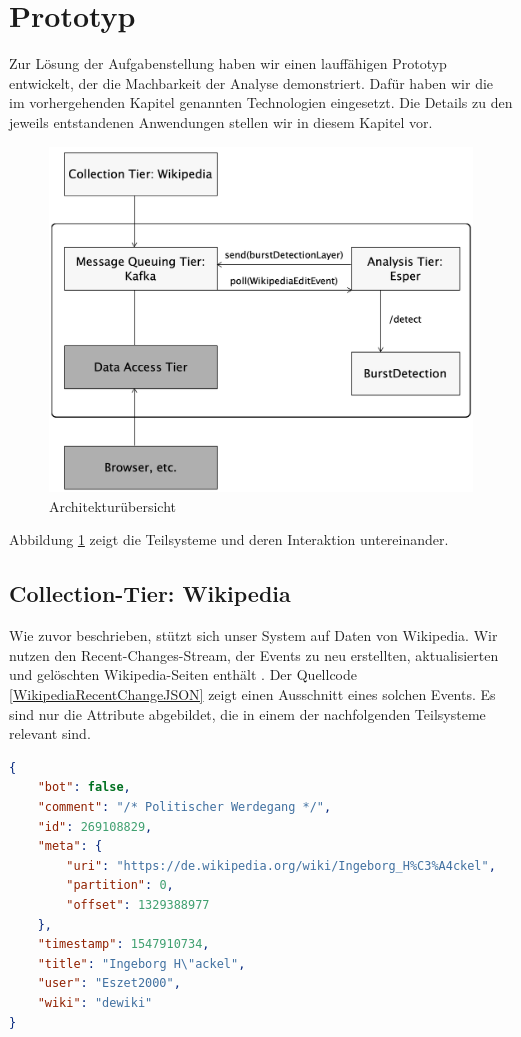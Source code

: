 \section{Prototyp}\label{section:prototyp}
Zur Lösung der Aufgabenstellung haben wir einen lauffähigen Prototyp entwickelt, der die Machbarkeit der Analyse demonstriert.
Dafür haben wir die im vorhergehenden Kapitel genannten Technologien eingesetzt. Die Details zu den jeweils entstandenen
Anwendungen stellen wir in diesem Kapitel vor.

\begin{figure}[h]
    \includegraphics[width=.5\textwidth]{images/Architektur_Uebersicht.png}
    \caption{Architekturübersicht}
    \label{fig:architektur_uebersicht}
\end{figure}

Abbildung \ref{fig:architektur_uebersicht} zeigt die Teilsysteme und deren Interaktion untereinander.


\subsection{Collection-Tier: Wikipedia}
Wie zuvor beschrieben, stützt sich unser System auf Daten von Wikipedia. Wir nutzen den Recent-Changes-Stream, der
Events zu neu erstellten, aktualisierten und gelöschten Wikipedia-Seiten enthält \cite{WikimediaManual}.
Der Quellcode \ref{WikipediaRecentChangeJSON} zeigt einen Ausschnitt eines solchen Events.
Es sind nur die Attribute abgebildet, die in einem der nachfolgenden Teilsysteme relevant sind.

\begin{lstlisting}[label=WikipediaRecentChangeJSON,caption=Wikipedia Recent-Change-Event,language=json,firstnumber=1,captionpos=b]
{
    "bot": false,
    "comment": "/* Politischer Werdegang */",
    "id": 269108829,
    "meta": {
        "uri": "https://de.wikipedia.org/wiki/Ingeborg_H%C3%A4ckel",
        "partition": 0,
        "offset": 1329388977
    },
    "timestamp": 1547910734,
    "title": "Ingeborg H\"ackel",
    "user": "Eszet2000",
    "wiki": "dewiki"
}
\end{lstlisting}

